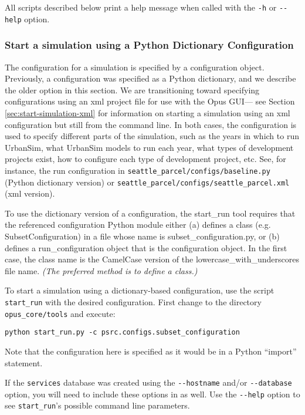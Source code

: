 All scripts described below print a help message when called with the
\verb|-h| or \verb|--help| option.

\subsubsection{Start a simulation using a Python Dictionary Configuration}

The configuration for a simulation is specified by a configuration object.
Previously, a configuration was specified as a Python dictionary, and we
describe the older option in this section.  We are transitioning toward
specifying configurations using an xml project file for use with the Opus
GUI--- see Section \ref{sec:start-simulation-xml} for information on
starting a simulation using an xml configuration but still from the command
line.  In both cases, the configuration is used to specify different parts
of the simulation, such as the years in which to run UrbanSim, what
UrbanSim models \modelsindex to run each year, what types of development
projects exist, how to configure each type of development project,
etc. See, for instance, the run configuration in
\verb|seattle_parcel/configs/baseline.py| (Python dictionary version) or
\verb|seattle_parcel/configs/seattle_parcel.xml| (xml version).

To use the dictionary version of a configuration, the start_run tool
requires that the referenced configuration Python module either (a) defines
a class (e.g. SubsetConfiguration) in a file whose name is
subset_configuration.py, or (b) defines a run_configuration object that is
the configuration object.  In the first case, the class name is the
CamelCase version of the lowercase_with_underscores file name.  \emph{(The
  preferred method is to define a class.)}

To start a simulation using a dictionary-based configuration, use the
script \verb|start_run| with the desired configuration.  First change to 
the directory \verb|opus_core/tools| and execute:
\begin{verbatim}
python start_run.py -c psrc.configs.subset_configuration
\end{verbatim}

Note that the configuration here is specified as it would be in a Python
``import'' statement.

If the \verb|services| database was created using the \verb|--hostname| and/or
\verb|--database| option, you will need to include these options in
 as well.  Use the \verb|--help| option to see
\verb|start_run|'s possible command line parameters.

